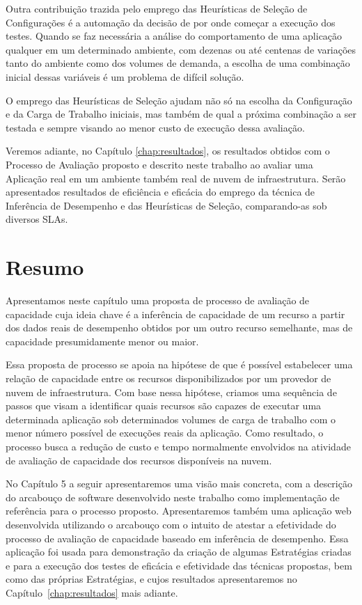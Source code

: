 Outra contribuição trazida pelo emprego das Heurísticas de Seleção de Configurações
é a automação da decisão de por onde começar a execução dos testes. Quando se faz
necessária a análise do comportamento de uma aplicação qualquer em um determinado
ambiente, com dezenas ou até centenas de variações tanto do ambiente como dos 
volumes de demanda, a escolha de uma combinação inicial dessas variáveis é um
problema de difícil solução.

O emprego das Heurísticas de Seleção ajudam não só na escolha da Configuração e 
da Carga de Trabalho iniciais, mas também de qual a próxima combinação a ser 
testada e sempre visando ao menor custo de execução dessa avaliação.

Veremos adiante, no Capítulo \ref{chap:resultados}, os resultados obtidos
com o Processo de Avaliação proposto e descrito neste trabalho ao avaliar uma
Aplicação real em um ambiente também real de nuvem de infraestrutura. Serão apresentados
resultados de eficiência e eficácia do emprego da técnica de Inferência de Desempenho
e das Heurísticas de Seleção, comparando-as sob diversos SLAs.

\section{Resumo}
Apresentamos neste capítulo uma proposta de processo de avaliação de capacidade
cuja ideia chave é a inferência de capacidade de um recurso a partir dos dados 
reais de desempenho obtidos por um outro recurso semelhante, mas de capacidade
presumidamente menor ou maior.

Essa proposta de processo se apoia na hipótese de que é possível estabelecer uma
relação de capacidade entre os recursos disponibilizados por um provedor de nuvem
de infraestrutura. Com base nessa hipótese, criamos uma sequência de passos que
visam a identificar quais recursos são capazes de executar uma determinada 
aplicação sob determinados volumes de carga de trabalho com o menor número
possível de execuções reais da aplicação. Como resultado, o processo busca
a redução de custo e tempo normalmente envolvidos na atividade de avaliação de
capacidade dos recursos disponíveis na nuvem.

No Capítulo 5 a seguir apresentaremos uma visão mais concreta, com a descrição do 
arcabouço de software desenvolvido neste trabalho como implementação de referência
para o processo proposto. Apresentaremos também uma aplicação
web desenvolvida utilizando o arcabouço com o intuito de atestar a efetividade do processo de avaliação 
de capacidade baseado em inferência de desempenho. Essa aplicação foi usada para
demonstração da criação de algumas Estratégias criadas e para a execução dos 
testes de eficácia e efetividade das técnicas propostas, bem como das próprias
Estratégias, e cujos resultados apresentaremos no Capítulo~\ref{chap:resultados}
mais adiante.
   
